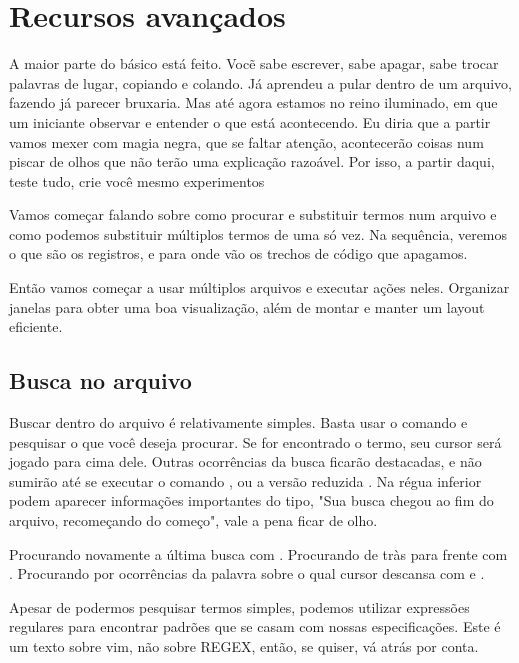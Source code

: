 \documentclass[a4paper, 12pt]{article}
\begin{document}
\newpage
\section{Recursos avançados}
A maior parte do básico está feito.
Vocẽ sabe escrever, sabe apagar, sabe trocar palavras de lugar, copiando e colando.
Já aprendeu a pular dentro de um arquivo, fazendo já parecer bruxaria. Mas até agora
estamos no reino iluminado, em que um iniciante observar e entender o que está acontecendo.
Eu diria que a partir vamos mexer com magia negra, que se faltar atenção, acontecerão coisas num piscar de olhos
que não terão uma explicação razoável.
Por isso, a partir daqui, teste tudo, crie você mesmo experimentos

Vamos começar falando sobre como procurar e substituir termos num arquivo e
como podemos substituir múltiplos termos de uma só vez.
Na sequência, veremos o que são os registros, e para onde vão os trechos de código que apagamos.

Então vamos começar a usar múltiplos arquivos e executar ações neles.
Organizar janelas para obter uma boa visualização, além de montar e manter um layout eficiente.

\subsection{Busca no arquivo}
Buscar dentro do arquivo é relativamente simples.
Basta usar o comando \vimcommand{/} e pesquisar o que você deseja procurar.
Se for encontrado o termo, seu cursor será jogado para cima dele.
Outras ocorrências da busca ficarão destacadas, e não sumirão até se executar o comando
, ou a versão reduzida . 
Na régua inferior podem aparecer informações importantes do tipo, "Sua busca chegou ao fim do arquivo, recomeçando do começo",
vale a pena ficar de olho.


Procurando novamente a última busca com \vimcommand{//}.
Procurando de tràs para frente com .
Procurando por ocorrências da palavra sobre o qual cursor descansa com \vimcommand{*} e \vimcommand{#}.

Apesar de podermos pesquisar termos simples, podemos utilizar expressões regulares para encontrar padrões que se casam com nossas especificações.
Este é um texto sobre vim, não sobre REGEX, então, se quiser, vá atrás por conta.
\end{document}
